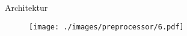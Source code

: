 \begin{frame}{Architektur}
    \begin{figure}
    	\centering
    	\texttt{[image: ./images/preprocessor/6.pdf]}
    \end{figure}
\end{frame}
